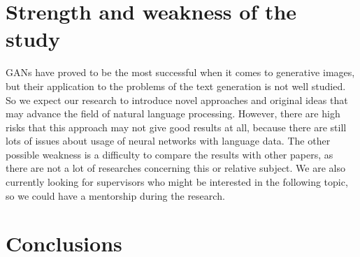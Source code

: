 \documentclass[sigplan]{acmart}
\begin{document}



\section{Strength and weakness of the study}
GANs have proved to be the most successful when it comes to generative images, but their application to the problems of the text generation is not well studied. So we expect our research to introduce novel approaches and original ideas that may advance the field of natural language processing.
However, there are high risks that this approach may not give good results at all, because there are still lots of issues about  usage of neural networks with language data. The other possible weakness is a difficulty to compare the results with other papers, as there are not a lot of researches concerning this or relative subject. 
We are also currently looking for supervisors who might be interested in the following topic, so we could have a mentorship during the research.

\section*{Conclusions}
\end{document}
